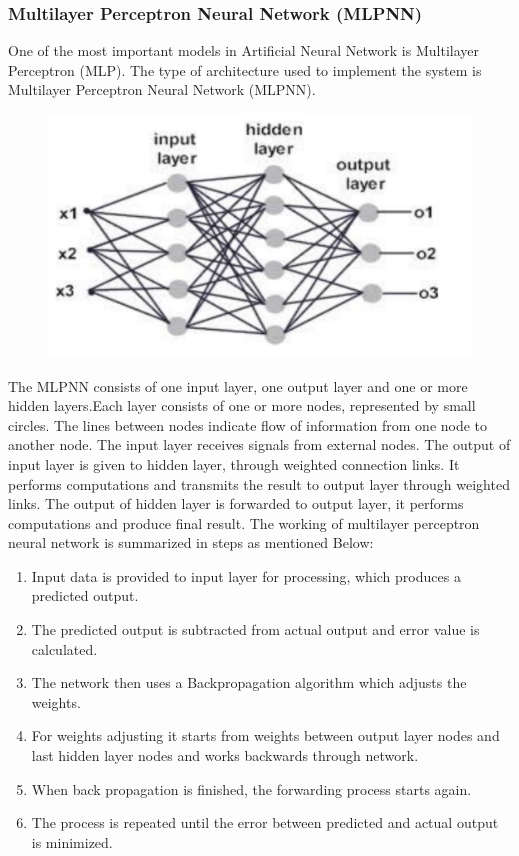 \documentclass{book}
\begin{document}
  		\subsubsection{Multilayer Perceptron Neural Network (MLPNN)}
  		One of the most important models in Artificial Neural Network is Multilayer Perceptron
  		(MLP). The  type of architecture  used to  implement  the system  is Multilayer Perceptron Neural Network (MLPNN).
  		\begin{figure}[H]
  			\begin{center}
  				\includegraphics[width=12cm]{images/mlpnn.png}
  			\end{center}
  		\end{figure}
  		The MLPNN consists of one input layer, one output layer and one or more hidden layers.Each layer consists of one or more nodes, represented by small circles. The lines between nodes indicate flow of information from one node to another node. The input layer receives signals from external nodes. The output of input layer is given to hidden layer, through weighted connection links. It performs computations and transmits the result to output layer through weighted links. The output of hidden layer is forwarded to output layer, it performs computations and produce final result. The working of multilayer perceptron neural network is summarized in steps as mentioned
  		Below:
  		\begin{enumerate}
  			\item Input data  is provided to input layer for processing, which  produces a
  			predicted output.
  			\item The predicted output is subtracted from actual output and error value is
  			calculated.
  			\item  The network then  uses a  Backpropagation algorithm  which  adjusts the
  			weights.
  			\item For weights adjusting it starts from weights between output layer nodes
  			and last hidden layer nodes and works backwards through network.
  			\item When back propagation is finished, the forwarding process starts again.
  			\item The process is repeated until the error between predicted and actual output
  			is minimized.
  		\end{enumerate}
  	
\end{document}
